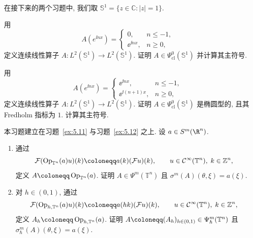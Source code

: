 在接下来的两个习题中, 我们取 $\mathbb{S}^1 = \{ z \in \mathbb{C} : |z| = 1 \}$.

\begin{exer}[一个投影算子]\label{ex:5.23}
用
\begin{equation}\label{eq:5.221}
    A(e^{\ii n x}) = \begin{cases} 0, & n \le -1, \\ \ee^{\ii n x}, & n \ge 0, \end{cases}
\end{equation}
定义连续线性算子 $A \colon L^2(\mathbb{S}^1) \to L^2(\mathbb{S}^1)$. 证明 $A \in \Psi_{\mathrm{cl}}^0(\mathbb{S}^1)$ 并计算其主符号.
\end{exer}

\begin{exer}[一个指标非零的椭圆算子]\label{ex:5.24}
用
\begin{equation}\label{eq:5.222}
    A(e^{\ii n x}) = \begin{cases} \ee^{\ii n x}, & n \le -1, \\ \ee^{\ii (n+1) x}, & n \ge 0, \end{cases}
\end{equation}
定义连续线性算子 $A \colon L^2(\mathbb{S}^1) \to L^2(\mathbb{S}^1)$. 证明 $A \in \Psi_{\mathrm{cl}}^0(\mathbb{S}^1)$ 是椭圆型的, 且其 Fredholm 指标为 $1$. 计算其主符号.
\end{exer}

\begin{exer}\label{ex:5.25}
本习题建立在习题~\ref{ex:5.11} 与习题~\ref{ex:5.12} 之上. 设 $a \in S^m(\R^n)$.
\begin{enumerate}
    \item 通过
    \begin{equation}\label{eq:5.223}
        \mathcal{F}(\Op_{\mathbb{T}^n}(a) u)(k) \defeq a(k) (\mathcal{F} u)(k), \qquad u \in \Smooth(\mathbb{T}^n), \; k \in \mathbb{Z}^n,
    \end{equation}
    定义 $A \defeq \Op_{\mathbb{T}^n}(a)$. 证明 $A \in \Psi^m(\mathbb{T}^n)$ 且 $\sigma^m(A)(\theta, \xi) = a(\xi)$.
    \item 对 $h \in (0, 1)$, 通过
    \begin{equation}\label{eq:5.224}
        \mathcal{F}(\Op_{h, \mathbb{T}^n}(a) u)(k) \defeq a(hk) (\mathcal{F} u)(k), \qquad u \in \Smooth(\mathbb{T}^n), \; k \in \mathbb{Z}^n,
    \end{equation}
    定义 $A_h \defeq \Op_{h, \mathbb{T}^n}(a)$. 证明 $A \defeq (A_h)_{h \in (0, 1)} \in \Psi_\hbar^m(\mathbb{T}^n)$ 且 $\sigma_\hbar^m(A)(\theta, \xi) = a(\xi)$.
\end{enumerate}
\end{exer}

